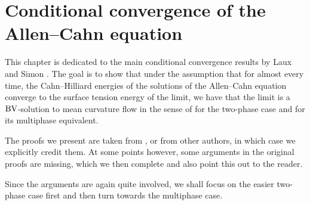 \chapter{Conditional convergence of the Allen--Cahn equation}
\label{chapter_conditional_convergence_of_ac}

This chapter is dedicated to the main conditional convergence results by Laux 
and Simon 
\cite{convergence_of_allen_cahn_equation_to_multiphase_mean_curvature_flow}.
The goal is to show that under the assumption that for almost every time, the 
Cahn--Hilliard energies of the solutions of the Allen--Cahn equation converge 
to the surface tension energy of the limit, we have that the limit is a $ \operatorname{BV} 
$-solution to mean curvature flow in the sense of  for the 
two-phase case and  for its multiphase equivalent.

The proofs we present are taken from 
\cite{convergence_of_allen_cahn_equation_to_multiphase_mean_curvature_flow}, 
or from other authors, 
in which case we explicitly credit them. At some points however, some arguments 
in the original proofs are missing, which we then complete and also point this 
out to the reader.

Since the arguments are again quite involved, we shall focus on the easier 
two-phase case first and then turn towards the multiphase case.


